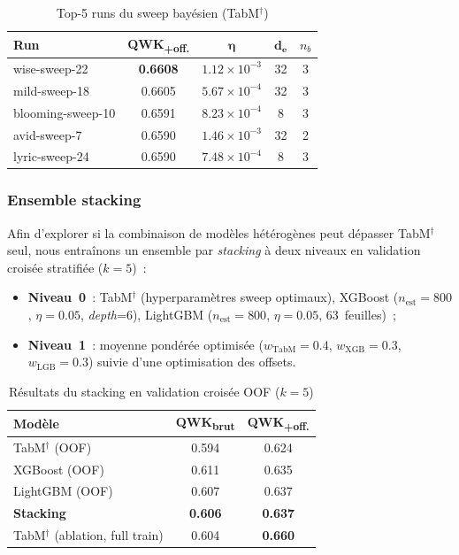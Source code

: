 \documentclass[conference]{IEEEtran}
\begin{document}
\begin{table}[htbp]
\caption{Top-5 runs du sweep bayésien (TabM$^\dagger$)}
\label{tab:sweep}
\centering
\begin{tabular}{lcccc}
\toprule
\textbf{Run} & \textbf{QWK\textsubscript{+off.}} & $\boldsymbol{\eta}$ &
$\boldsymbol{d_e}$ & $n_b$ \\
\midrule
wise-sweep-22    & \textbf{0.6608} & $1.12\times10^{-3}$ & 32 & 3 \\
mild-sweep-18    & 0.6605 & $5.67\times10^{-4}$ & 32 & 3 \\
blooming-sweep-10 & 0.6591 & $8.23\times10^{-4}$ & 8  & 3 \\
avid-sweep-7     & 0.6590 & $1.46\times10^{-3}$ & 32 & 2 \\
lyric-sweep-24   & 0.6590 & $7.48\times10^{-4}$ & 8  & 3 \\
\bottomrule
\end{tabular}
\end{table}

\subsubsection{Ensemble stacking}

Afin d'explorer si la combinaison de modèles hétérogènes peut dépasser
TabM$^\dagger$ seul, nous entraînons un ensemble par \textit{stacking}
à deux niveaux en validation croisée stratifiée ($k=5$)~:
\begin{itemize}
  \item \textbf{Niveau~0}~: TabM$^\dagger$ (hyperparamètres sweep optimaux),
        XGBoost ($n_\text{est}=800$, $\eta=0.05$, \textit{depth}=6),
        LightGBM ($n_\text{est}=800$, $\eta=0.05$, 63~feuilles)~;
  \item \textbf{Niveau~1}~: moyenne pondérée optimisée ($w_{\text{TabM}}=0.4$,
        $w_{\text{XGB}}=0.3$, $w_{\text{LGB}}=0.3$) suivie d'une optimisation
        des offsets.
\end{itemize}

\begin{table}[htbp]
\caption{Résultats du stacking en validation croisée OOF ($k=5$)}
\label{tab:stacking}
\centering
\begin{tabular}{lcc}
\toprule
\textbf{Modèle} & \textbf{QWK\textsubscript{brut}} &
\textbf{QWK\textsubscript{+off.}} \\
\midrule
TabM$^\dagger$ (OOF)   & 0.594 & 0.624 \\
XGBoost (OOF)          & 0.611 & 0.635 \\
LightGBM (OOF)         & 0.607 & 0.637 \\
\textbf{Stacking}      & \textbf{0.606} & \textbf{0.637} \\
\midrule
TabM$^\dagger$ (ablation, full train) & 0.604 & \textbf{0.660} \\
\bottomrule
\end{tabular}
\end{table}
\end{document}
